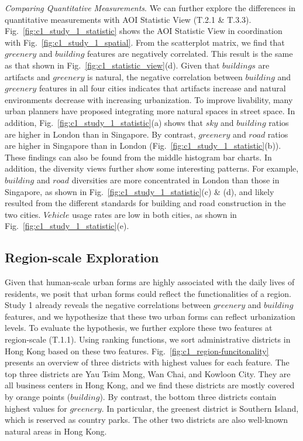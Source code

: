 \vspace*{2mm}
\noindent
\textit{Comparing Quantitative Measurements}.
We can further explore the differences in quantitative measurements with AOI Statistic View (T.2.1 \& T.3.3).
Fig.~\ref{fig:c1_study_1_statistic} shows the AOI Statistic View in coordination with Fig.~\ref{fig:c1_study_1_spatial}.
From the scatterplot matrix, we find that $greenery$ and $building$ features are negatively correlated.
This result is the same as that shown in Fig.~\ref{fig:c1_statistic_view}(d).
Given that $buildings$ are artifacts and $greenery$ is natural, the negative correlation between $building$ and $greenery$ features in all four cities indicates that artifacts increase and natural environments decrease with increasing urbanization.
To improve livability, many urban planners have proposed integrating more natural spaces in street space.
In addition, Fig.~\ref{fig:c1_study_1_statistic}(a) shows that $sky$ and $building$ ratios are higher in London than in Singapore.
By contrast, $greenery$ and $road$ ratios are higher in Singapore than in London (Fig.~\ref{fig:c1_study_1_statistic}(b)).
These findings can also be found from the middle histogram bar charts.
In addition, the diversity views further show some interesting patterns.
For example, $building$ and $road$ diversities are more concentrated in London than those in Singapore, as shown in Fig.~\ref{fig:c1_study_1_statistic}(c) \& (d), and likely resulted from the different standards for building and road construction in the two cities.
$Vehicle$ usage rates are low in both cities, as shown in Fig.~\ref{fig:c1_study_1_statistic}(e).


\subsection{Region-scale Exploration}

Given that human-scale urban forms are highly associated with the daily lives of residents, we posit that urban forms could reflect the functionalities of a region.
Study 1 already reveals the negative correlations between $greenery$ and $building$ features, and we hypothesize that these two urban forms can reflect urbanization levels.
To evaluate the hypothesis, we further explore these two features at region-scale (T.1.1).
Using ranking functions, we sort administrative districts in Hong Kong based on these two features.
Fig.~\ref{fig:c1_region-funcitonality} presents an overview of three districts with highest values for each feature.
The top three districts are Yau Tsim Mong, Wan Chai, and Kowloon City.
They are all business centers in Hong Kong, and we find these districts are mostly covered by orange points ($building$). 
By contrast, the bottom three districts contain highest values for $greenery$.
In particular, the greenest district is Southern Island, which is reserved as country parks.
The other two districts are also well-known natural areas in Hong Kong.
 
